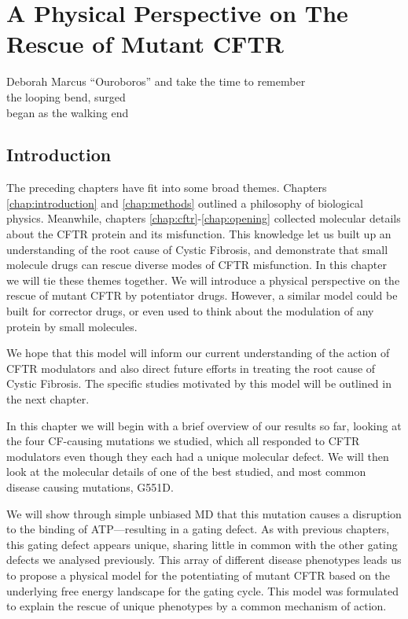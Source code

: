 \chapter{A Physical Perspective on The Rescue of Mutant CFTR}
\label{chap:perspective}

\begin{chapquote}{Deborah Marcus ``Ouroboros'' \cite{marcus_ouroboros}}
and take the time to remember\\
the looping bend, surged\\
began as the walking end
\end{chapquote}

\section{Introduction}

The preceding chapters have fit into some broad themes. Chapters \ref{chap:introduction} and \ref{chap:methods} outlined a philosophy of biological physics. Meanwhile, chapters \ref{chap:cftr}-\ref{chap:opening} collected molecular details about the CFTR protein and its misfunction. This knowledge let us built up an understanding of the root cause of Cystic Fibrosis, and demonstrate that small molecule drugs can rescue diverse modes of CFTR misfunction. In this chapter we will tie these themes together. We will introduce a physical perspective on the rescue of mutant CFTR by potentiator drugs. However, a similar model could be built for corrector drugs, or even used to think about the modulation of any protein by small molecules.

We hope that this model will inform our current understanding of the action of CFTR modulators and also direct future efforts in treating the root cause of Cystic Fibrosis. The specific studies motivated by this model will be outlined in the next chapter.

In this chapter we will begin with a brief overview of our results so far, looking at the four CF-causing mutations we studied, which all responded to CFTR modulators even though they each had a unique molecular defect. We will then look at the molecular details of one of the best studied, and most common disease causing mutations, G551D.  

We will show through simple unbiased MD that this mutation causes a disruption to the binding of ATP---resulting in a gating defect. As with previous chapters, this gating defect appears unique, sharing little in common with the other gating defects we analysed previously. This array of different disease phenotypes leads us to propose a physical model for the potentiating of mutant CFTR based on the underlying free energy landscape for the gating cycle. This model was formulated to explain the rescue of unique phenotypes by a common mechanism of action. 

